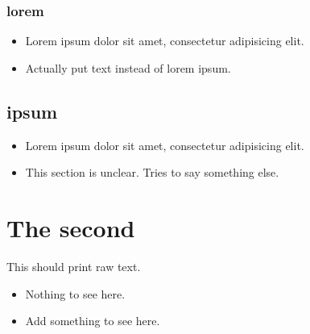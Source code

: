 \subsection{lorem}
\label{autosec:4}
    \begin{itemize}[noitemsep]
        \item Lorem ipsum dolor sit amet, consectetur adipisicing elit.
        \item {\color{red}Actually put text instead of lorem ipsum.}
    \end{itemize}
\section{ipsum}
\label{autosec:5}
    \begin{itemize}[noitemsep]
        \item Lorem ipsum dolor sit amet, consectetur adipisicing elit.
        \item {\color{OliveGreen}This section is unclear.}
{\color{OliveGreen}Tries to say something else.}
    \end{itemize}
\chapter{The second}
\label{autosec:6}
This should print raw text.
    \begin{itemize}[noitemsep]
        \item Nothing to see here.
        \item {\color{red}Add something to see here.}
    \end{itemize}


